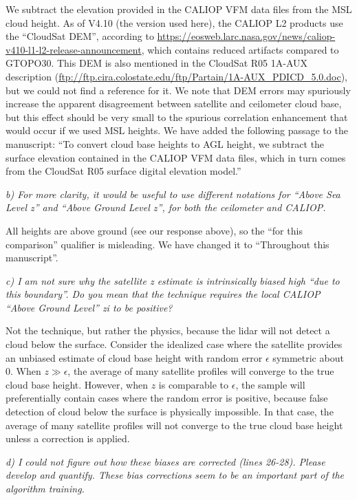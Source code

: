 \documentclass[12pt,a4paper]{responses}
\begin{document}
We subtract the elevation provided in the CALIOP VFM data files from the MSL
cloud height.  As of V4.10 (the version used here), the CALIOP L2 products use
the ``CloudSat DEM'', according to
\url{https://eosweb.larc.nasa.gov/news/caliop-v410-l1-l2-release-announcement},
which contains reduced artifacts compared to GTOPO30.  This DEM is also
mentioned in the CloudSat R05 1A-AUX description
(\url{ftp://ftp.cira.colostate.edu/ftp/Partain/1A-AUX_PDICD_5.0.doc}), but we
could not find a reference for it.  We note that DEM errors may spuriously
increase the apparent disagreement between satellite and ceilometer cloud base,
but this effect should be very small to the spurious correlation enhancement
that would occur if we used MSL heights.  We have added the following passage to
the manuscript: ``To convert cloud base heights to AGL height, we subtract the
surface elevation contained in the CALIOP VFM data files, which in turn comes
from the CloudSat R05 surface digital elevation model.''

\textit{b) For more clarity,  it would be
useful  to  use  different  notations  for  “Above  Sea  Level  z”  and  “Above  Ground  Level
z”, for both the ceilometer and CALIOP.} 

All heights are above ground (see our response above), so the ``for this
comparison'' qualifier is misleading.  We have changed it to ``Throughout this
manuscript''. 

\textit{c) I am not sure why the satellite z estimate
is intrinsically biased high “due to this boundary”.   Do you mean that the technique
requires the local CALIOP “Above Ground Level” zi to be positive?} 

Not the technique, but rather the physics, because the lidar will not detect a
cloud below the surface.  Consider the idealized case where the
satellite provides an unbiased estimate of cloud base height with random error
$\epsilon$ symmetric about 0.  When $z\gg\epsilon$, the average of many satellite profiles will
converge to the true cloud base height.  However, when $z$ is comparable to
$\epsilon$, the sample will preferentially contain cases where the random error
is positive, because false detection of cloud below the surface is physically
impossible.  In that case, the average of many satellite profiles will not
converge to the true cloud base height unless a correction is applied.

\textit{d) I could not figure
out how these biases are corrected (lines 26-28). Please develop and quantify. These
bias corrections seem to be an important part of the algorithm training.}
\end{document}

